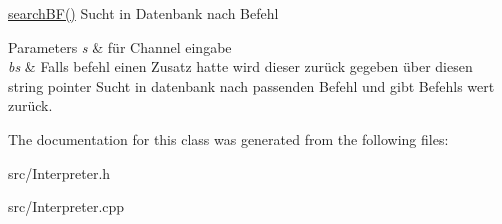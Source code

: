 \hyperlink{classInterpreter_a1adb849ed4720b61dcee870c3e383a8a}{search\-B\-F()} \-Sucht in \-Datenbank nach \-Befehl 


\begin{DoxyParams}{\-Parameters}
{\em s} & für \-Channel eingabe \\
\hline
{\em bs} & \-Falls befehl einen \-Zusatz hatte wird dieser zurück gegeben über diesen string pointer \-Sucht in datenbank nach passenden \-Befehl und gibt \-Befehls wert zurück. \\
\hline
\end{DoxyParams}


\-The documentation for this class was generated from the following files\-:\begin{DoxyCompactItemize}
\item 
src/\-Interpreter.\-h\item 
src/\-Interpreter.\-cpp\end{DoxyCompactItemize}
